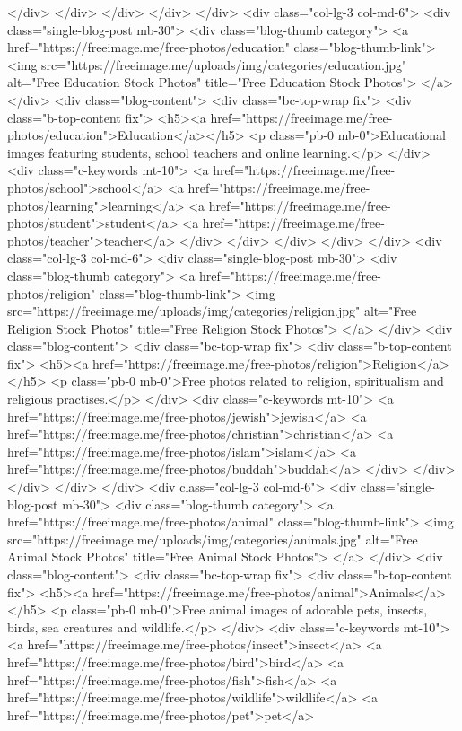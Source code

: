 </div>
</div>
</div>
</div>
</div>
<div class="col-lg-3 col-md-6">
<div class="single-blog-post mb-30">
<div class="blog-thumb category">
<a href="https://freeimage.me/free-photos/education" class="blog-thumb-link">
<img src="https://freeimage.me/uploads/img/categories/education.jpg" alt="Free Education Stock Photos" title="Free Education Stock Photos">
</a>
</div>
<div class="blog-content">
<div class="bc-top-wrap fix">
<div class="b-top-content fix">
<h5><a href="https://freeimage.me/free-photos/education">Education</a></h5>
<p class="pb-0 mb-0">Educational images featuring students, school teachers and online learning.</p>
</div>
<div class="c-keywords mt-10">
<a href="https://freeimage.me/free-photos/school">school</a> <a href="https://freeimage.me/free-photos/learning">learning</a> <a href="https://freeimage.me/free-photos/student">student</a> <a href="https://freeimage.me/free-photos/teacher">teacher</a>
</div>
</div>
</div>
</div>
</div>
<div class="col-lg-3 col-md-6">
<div class="single-blog-post mb-30">
<div class="blog-thumb category">
<a href="https://freeimage.me/free-photos/religion" class="blog-thumb-link">
<img src="https://freeimage.me/uploads/img/categories/religion.jpg" alt="Free Religion Stock Photos" title="Free Religion Stock Photos">
</a>
</div>
<div class="blog-content">
<div class="bc-top-wrap fix">
<div class="b-top-content fix">
<h5><a href="https://freeimage.me/free-photos/religion">Religion</a></h5>
<p class="pb-0 mb-0">Free photos related to religion, spiritualism and religious practises.</p>
</div>
<div class="c-keywords mt-10">
<a href="https://freeimage.me/free-photos/jewish">jewish</a> <a href="https://freeimage.me/free-photos/christian">christian</a> <a href="https://freeimage.me/free-photos/islam">islam</a> <a href="https://freeimage.me/free-photos/buddah">buddah</a>
</div>
</div>
</div>
</div>
</div>
<div class="col-lg-3 col-md-6">
<div class="single-blog-post mb-30">
<div class="blog-thumb category">
<a href="https://freeimage.me/free-photos/animal" class="blog-thumb-link">
<img src="https://freeimage.me/uploads/img/categories/animals.jpg" alt="Free Animal Stock Photos" title="Free Animal Stock Photos">
</a>
</div>
 <div class="blog-content">
<div class="bc-top-wrap fix">
<div class="b-top-content fix">
<h5><a href="https://freeimage.me/free-photos/animal">Animals</a></h5>
<p class="pb-0 mb-0">Free animal images of adorable pets, insects, birds, sea creatures and wildlife.</p>
</div>
<div class="c-keywords mt-10">
<a href="https://freeimage.me/free-photos/insect">insect</a> <a href="https://freeimage.me/free-photos/bird">bird</a> <a href="https://freeimage.me/free-photos/fish">fish</a> <a href="https://freeimage.me/free-photos/wildlife">wildlife</a> <a href="https://freeimage.me/free-photos/pet">pet</a>
